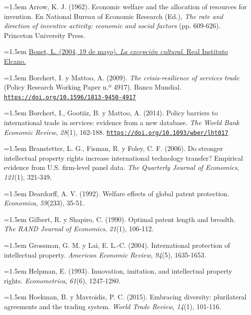 \documentclass[10pt,a4paper]{article}
\begin{document}
\noindent\hangindent=1.5em Arrow, K. J. (1962). Economic welfare and the allocation of resources for invention. En National Bureau of Economic Research (Ed.), \textit{The rate and direction of inventive activity: economic and social factors} (pp. 609-626). Princeton University Press.

\noindent\hangindent=1.5em \href{https://www.realinstitutoelcano.org/analisis/la-excepcion-cultural/}{Bonet, L. (2004, 19 de mayo). \textit{La excepción cultural}. Real Instituto Elcano.}

\noindent\hangindent=1.5em Borchert, I. y Mattoo, A. (2009). \textit{The crisis-resilience of services trade} (Policy Research Working Paper n.º 4917). Banco Mundial. \href{https://doi.org/10.1596/1813-9450-4917}{\nolinkurl{https://doi.org/10.1596/1813-9450-4917}}

\noindent\hangindent=1.5em Borchert, I., Gootiiz, B. y Mattoo, A. (2014). Policy barriers to international trade in services: evidence from a new database. \textit{The World Bank Economic Review}, \textit{28}(1), 162-188. \href{https://doi.org/10.1093/wber/lht017}{\nolinkurl{https://doi.org/10.1093/wber/lht017}}

\noindent\hangindent=1.5em Branstetter, L. G., Fisman, R. y Foley, C. F. (2006). Do stronger intellectual property rights increase international technology transfer? Empirical evidence from U.S. firm-level panel data. \textit{The Quarterly Journal of Economics}, \textit{121}(1), 321-349.

\noindent\hangindent=1.5em Deardorff, A. V. (1992). Welfare effects of global patent protection. \textit{Economica}, \textit{59}(233), 35-51.

\noindent\hangindent=1.5em Gilbert, R. y Shapiro, C. (1990). Optimal patent length and breadth. \textit{The RAND Journal of Economics}, \textit{21}(1), 106-112.

\noindent\hangindent=1.5em Grossman, G. M. y Lai, E. L.-C. (2004). International protection of intellectual property. \textit{American Economic Review}, \textit{94}(5), 1635-1653.

\noindent\hangindent=1.5em Helpman, E. (1993). Innovation, imitation, and intellectual property rights. \textit{Econometrica}, \textit{61}(6), 1247-1280.

\noindent\hangindent=1.5em Hoekman, B. y Mavroidis, P. C. (2015). Embracing diversity: plurilateral agreements and the trading system. \textit{World Trade Review}, \textit{14}(1), 101-116.
\end{document}
